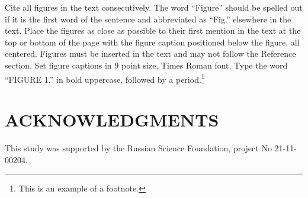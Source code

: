 \documentclass{aip-cp}
\begin{document}
Cite all figures in the text consecutively. The word ``Figure'' should be spelled out if it is the first word of the sentence and abbreviated as ``Fig.'' elsewhere in the text. Place the figures as close as possible to their first mention in the text at the top or bottom of the page with the figure caption positioned below the figure, all centered. Figures must be inserted in the text and may not follow the Reference section. Set figure captions in 9 point size, Times Roman font. Type the word ``FIGURE 1.'' in bold uppercase, followed by a period.\footnote{This is an example of a footnote.}

\section{ACKNOWLEDGMENTS}
This study was supported by the Russian Science Foundation, project No 21-11-00204.

\cite{Strongin2000,Kalyulin2017,Evtushenko2013,Jones2009,Zilinskas2010,Pinter1996,globalizerSystem,Barkalov2010,Strongin2020,Issa1986_1,Issa1986_2,OpenFOAM}




%
%
\end{document}
